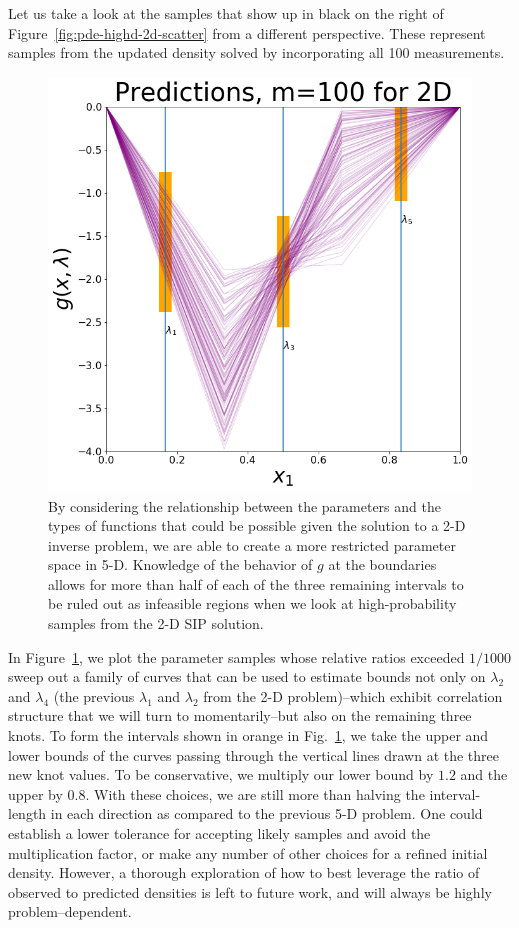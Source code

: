 
Let us take a look at the samples that show up in black on the right of Figure~\ref{fig:pde-highd-2d-scatter} from a different perspective.
These represent samples from the updated density solved by incorporating all 100 measurements.

\begin{figure}[htbp]
\centering
  \includegraphics[width=0.675\linewidth]{figures/pde-highd/pde-highd-alt_initial_D5_m100.png}
\caption{
By considering the relationship between the parameters and the types of functions that could be possible given the solution to a 2-D inverse problem, we are able to create a more restricted parameter space in 5-D.
Knowledge of the behavior of $g$ at the boundaries allows for more than half of each of the three remaining intervals to be ruled out as infeasible regions when we look at high-probability samples from the 2-D SIP solution.
}
\label{fig:pde-highd-5d-study}
\end{figure}

In Figure~\ref{fig:pde-highd-5d-study}, we plot the parameter samples whose relative ratios exceeded $1/1000$ sweep out a family of curves that can be used to estimate bounds not only on $\lambda_2$ and $\lambda_4$ (the previous $\lambda_1$ and $\lambda_2$ from the 2-D problem)\---which exhibit correlation structure that we will turn to momentarily\---but also on the remaining three knots.
To form the intervals shown in orange in Fig.~\ref{fig:pde-highd-5d-study}, we take the upper and lower bounds of the curves passing through the vertical lines drawn at the three new knot values.
To be conservative, we multiply our lower bound by $1.2$ and the upper by $0.8$.
With these choices, we are still more than halving the interval-length in each direction as compared to the previous 5-D problem.
One could establish a lower tolerance for accepting likely samples and avoid the multiplication factor, or make any number of other choices for a refined initial density.
However, a thorough exploration of how to best leverage the ratio of observed to predicted densities is left to future work, and will always be highly problem--dependent.


